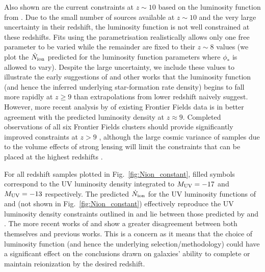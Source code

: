 Also shown are the current constraints at $z\sim10$ based on the luminosity function from \citet{Oesch:2014cs}. Due to the small number of sources available at $z\sim10$ and the very large uncertainty in their redshift, the luminosity function is not well constrained at these redshifts. Fits using the \citet{Schechter:1976gl} parametrisation realistically allows only one free parameter to be varied while the remainder are fixed to their $z\sim8$ values (we plot the $\dot{N}_{\rm{ion}}$ predicted for the luminosity function parameters where $\phi_{*}$ is allowed to vary). Despite the large uncertainty, we include these values to illustrate the early suggestions of \citet{Oesch:2014cs} and other works \citep{Zheng:2012hu,Coe:2012ko} that the luminosity function (and hence the inferred underlying star-formation rate density) begins to fall more rapidly at $z \geq 9$ than extrapolations from lower redshift naively suggest. However, more recent analysis by \citet{McLeod:2014wz} of existing Frontier Fields data is in better agreement with the predicted luminosity density at $z \approx 9$. Completed observations of all six Frontier Fields clusters should provide significantly improved constraints at $z>9$ \citep{Coe:2014tq}, although the large cosmic variance of samples due to the volume effects of strong lensing will limit the constraints that can be placed at the highest redshifts \citep{Robertson:2014uv}.

For all redshift samples plotted in Fig.~\ref{fig:Nion_constant}, filled symbols correspond to the UV luminosity density integrated to $M_{\rm{UV}} = -17$ and $M_{\rm{UV}} = -13$ respectively. The predicted $\dot{N}_{\rm{ion}}$ for the UV luminosity functions of \citet{Schenker:2013cl} and \citet{McLure:2013hh} (not shown in Fig.~\ref{fig:Nion_constant}) effectively reproduce the UV luminosity density constraints outlined in \citet{Robertson:2013ji} and lie between those predicted by \citet{Bouwens:2014tx} and \citet{Finkelstein:2014ub}. The more recent works of \citet{Bouwens:2014tx} and \citet{Finkelstein:2014ub} show a greater disagreement between both themselves and previous works. This is a concern as it means that the choice of luminosity function (and hence the underlying selection/methodology) could have a significant effect on the conclusions drawn on galaxies' ability to complete or maintain reionization by the desired redshift.


